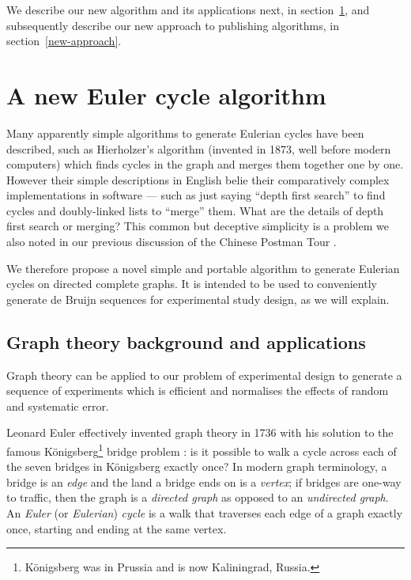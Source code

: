 \documentclass[12pt]{article}
\begin{document}
We describe our new algorithm and its applications next, in section~\ref{new-algorithm}, and subsequently describe our new approach to publishing algorithms, in section~\ref{new-approach}.

\section{A new Euler cycle algorithm}\label{new-algorithm}
Many apparently simple algorithms to generate Eulerian cycles have been described, such as Hierholzer's algorithm \cite{hierholzer} (invented in 1873, well before modern computers) which finds cycles in the graph and merges them together one by one. However their simple descriptions in English belie their comparatively complex implementations in software --- such as just saying ``depth first search'' to find cycles and doubly-linked lists to ``merge'' them. What are the details of depth first search or merging? This common but deceptive simplicity is a problem we also noted in our previous discussion of the Chinese Postman Tour \cite{cpp}. 

We therefore propose a novel simple and portable algorithm to generate Eulerian cycles on directed complete graphs. It is intended to be used to conveniently generate de Bruijn sequences for experimental study design, as we will explain. 

\subsection{Graph theory background and applications}\label{graphtheory}
Graph theory can be applied to our problem of experimental design to generate a sequence of experiments which is efficient and normalises the effects of random and systematic error.

Leonard Euler effectively invented graph theory in 1736 with his solution to the famous K\"onigsberg\footnote{K\"onigsberg was in Prussia and is now Kaliningrad, Russia.} bridge problem \cite{euler,wilson}: is it possible to walk a cycle across each of the seven bridges in K\"onigsberg exactly once? In modern graph terminology, a bridge is an \emph{edge\/} and the land a bridge ends on is a \emph{vertex\/}; if bridges are one-way to traffic, then the graph is a \emph{directed graph\/} as opposed to an \emph{undirected graph\/}. An \emph{Euler\/} (or \emph{Eulerian\/}) \emph{cycle\/} is a walk that traverses each edge of a graph exactly once, starting and ending at the same vertex.%
\end{document}
